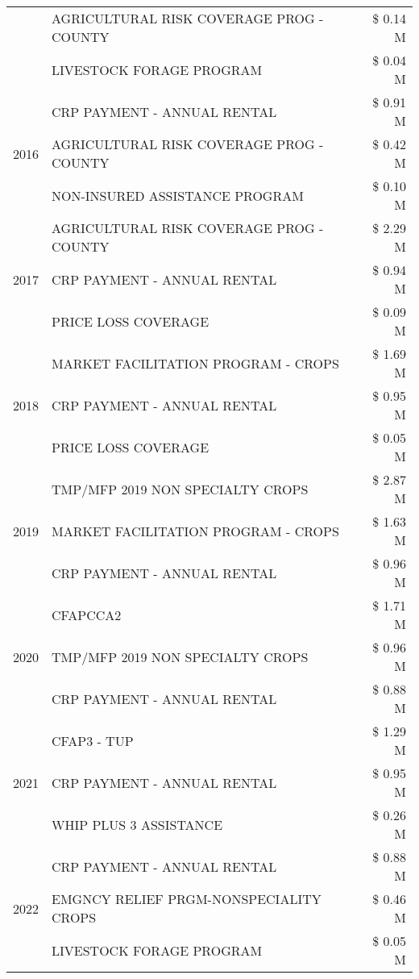 \begin{tabular}{llr}
 & AGRICULTURAL RISK COVERAGE PROG - COUNTY & \$ 0.14 M \\
 & LIVESTOCK FORAGE PROGRAM & \$ 0.04 M \\
\cline{1-3}
\multirow[t]{3}{*}{2016} & CRP PAYMENT - ANNUAL RENTAL & \$ 0.91 M \\
 & AGRICULTURAL RISK COVERAGE PROG - COUNTY & \$ 0.42 M \\
 & NON-INSURED ASSISTANCE PROGRAM & \$ 0.10 M \\
\cline{1-3}
\multirow[t]{3}{*}{2017} & AGRICULTURAL RISK COVERAGE PROG - COUNTY & \$ 2.29 M \\
 & CRP PAYMENT - ANNUAL RENTAL & \$ 0.94 M \\
 & PRICE LOSS COVERAGE & \$ 0.09 M \\
\cline{1-3}
\multirow[t]{3}{*}{2018} & MARKET FACILITATION PROGRAM - CROPS & \$ 1.69 M \\
 & CRP PAYMENT - ANNUAL RENTAL & \$ 0.95 M \\
 & PRICE LOSS COVERAGE & \$ 0.05 M \\
\cline{1-3}
\multirow[t]{3}{*}{2019} & TMP/MFP 2019 NON SPECIALTY CROPS & \$ 2.87 M \\
 & MARKET FACILITATION PROGRAM - CROPS & \$ 1.63 M \\
 & CRP PAYMENT - ANNUAL RENTAL & \$ 0.96 M \\
\cline{1-3}
\multirow[t]{3}{*}{2020} & CFAPCCA2 & \$ 1.71 M \\
 & TMP/MFP 2019 NON SPECIALTY CROPS & \$ 0.96 M \\
 & CRP PAYMENT - ANNUAL RENTAL & \$ 0.88 M \\
\cline{1-3}
\multirow[t]{3}{*}{2021} & CFAP3 - TUP & \$ 1.29 M \\
 & CRP PAYMENT - ANNUAL RENTAL & \$ 0.95 M \\
 & WHIP PLUS 3 ASSISTANCE & \$ 0.26 M \\
\cline{1-3}
\multirow[t]{3}{*}{2022} & CRP PAYMENT - ANNUAL RENTAL & \$ 0.88 M \\
 & EMGNCY RELIEF PRGM-NONSPECIALITY CROPS & \$ 0.46 M \\
 & LIVESTOCK FORAGE PROGRAM & \$ 0.05 M \\
\cline{1-3}
\bottomrule
\end{tabular}
